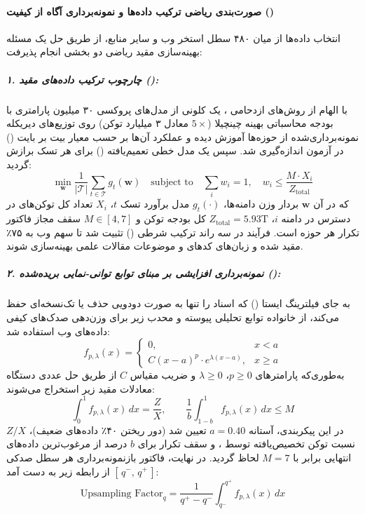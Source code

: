 \paragraph*{صورت‌بندی ریاضی ترکیب داده‌ها و نمونه‌برداری آگاه از کیفیت ()}
انتخاب داده‌ها از میان ۴۸۰ سطل استخر وب و سایر منابع، از طریق حل یک مسئله بهینه‌سازی مقید ریاضی دو بخشی انجام پذیرفت:

\subparagraph*{۱. چارچوب ترکیب داده‌های مقید ():}
با الهام از روش‌های ازدحامی \cite{liu2024regmix, ye2025data, diao2025climb}، یک کلونی از مدل‌های پروکسی ۳۰ میلیون پارامتری با بودجه محاسباتی بهینه چینچیلا ($5\times$ معادل ۳ میلیارد توکن) روی توزیع‌های دیریکله نمونه‌برداری‌شده از حوزه‌ها آموزش دیده و عملکرد آن‌ها بر حسب معیار بیت بر بایت () در آزمون  اندازه‌گیری شد. سپس یک مدل خطی تعمیم‌یافته () برای هر تسک برازش گردید:
\begin{equation}
    \min_{\mathbf{w}} \frac{1}{|\mathcal{T}|} \sum_{t \in \mathcal{T}} g_t(\mathbf{w}) \quad \text{subject to} \quad \sum_{i} w_i = 1, \quad w_i \le \frac{M \cdot X_i}{Z_{\text{total}}}
\end{equation}
که در آن $\mathbf{w}$ بردار وزن دامنه‌ها، $g_t(\cdot)$ مدل برآورد  تسک $t$، $X_i$ تعداد کل توکن‌های در دسترس در دامنه $i$، $Z_{\text{total}} = 5.93\text{T}$ کل بودجه توکن و $M \in [4, 7]$ سقف مجاز فاکتور تکرار هر حوزه است. فرآیند در سه راند ترکیب شرطی () تثبیت شد تا سهم وب به ۷۵٪ مقید شده و زبان‌های کدهای  \cite{allal2025smollm2, lozhkov2024starcoder2} و موضوعات مقالات علمی بهینه‌سازی شوند.

\subparagraph*{۲. نمونه‌برداری افزایشی بر مبنای توابع توانی-نمایی بریده‌شده ():}
به جای فیلترینگ ایستا () که اسناد را تنها به صورت دودویی حذف یا تک‌نسخه‌ای حفظ می‌کند، از خانواده توابع تحلیلی پیوسته و محدب زیر برای وزن‌دهی صدک‌های کیفی داده‌های وب استفاده شد:
\begin{equation}
    f_{p,\lambda}(x) = \begin{cases} 
        0, & x < a \\ 
        C(x - a)^p \cdot e^{\lambda(x - a)}, & x \ge a 
    \end{cases}
\end{equation}
به‌طوری‌که پارامترهای $p \ge 0$، $\lambda \ge 0$ و ضریب مقیاس $C$ از طریق حل عددی دستگاه معادلات مقید زیر استخراج می‌شوند:
\begin{equation}
    \int_{0}^{1} f_{p,\lambda}(x)\,dx = \frac{Z}{X}, \qquad \frac{1}{b}\int_{1-b}^{1} f_{p,\lambda}(x)\,dx \le M
\end{equation}
در این پیکربندی، آستانه $a = 0.40$ تعیین شد (دور ریختن ۴۰٪ داده‌های ضعیف)، $Z/X$ نسبت توکن تخصیص‌یافته توسط ، و سقف تکرار برای $b$ درصد از مرغوب‌ترین داده‌های انتهایی برابر با $M = 7$ لحاظ گردید. در نهایت، فاکتور بازنمونه‌برداری هر سطل صدکی $[\,q^-,\, q^+\,]$ از رابطه زیر به دست آمد:
\begin{equation}
    \text{Upsampling Factor}_q = \frac{1}{q^+ - q^-} \int_{q^-}^{q^+} f_{p,\lambda}(x)\,dx
\end{equation}

